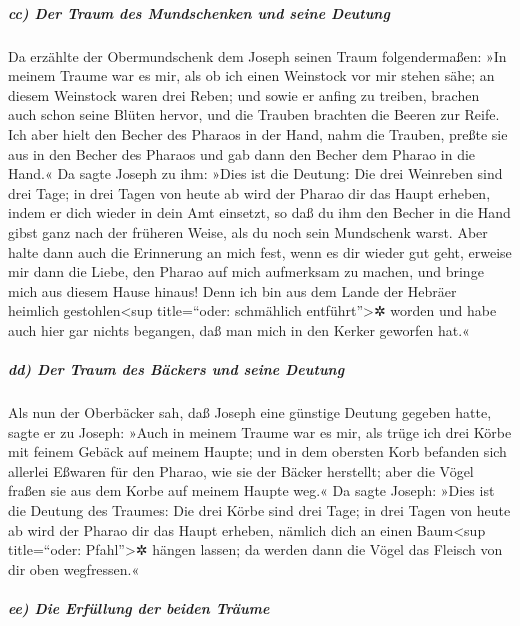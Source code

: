 \hypertarget{cc-der-traum-des-mundschenken-und-seine-deutung}{%
\subparagraph{cc) Der Traum des Mundschenken und seine
Deutung}\label{cc-der-traum-des-mundschenken-und-seine-deutung}}

 Da erzählte der Obermundschenk dem Joseph seinen Traum
folgendermaßen: »In meinem Traume war es mir, als ob ich einen Weinstock
vor mir stehen sähe;  an diesem Weinstock waren drei
Reben; und sowie er anfing zu treiben, brachen auch schon seine Blüten
hervor, und die Trauben brachten die Beeren zur Reife. 
Ich aber hielt den Becher des Pharaos in der Hand, nahm die Trauben,
preßte sie aus in den Becher des Pharaos und gab dann den Becher dem
Pharao in die Hand.«  Da sagte Joseph zu ihm: »Dies ist
die Deutung: Die drei Weinreben sind drei Tage;  in drei
Tagen von heute ab wird der Pharao dir das Haupt erheben, indem er dich
wieder in dein Amt einsetzt, so daß du ihm den Becher in die Hand gibst
ganz nach der früheren Weise, als du noch sein Mundschenk warst.
 Aber halte dann auch die Erinnerung an mich fest, wenn
es dir wieder gut geht, erweise mir dann die Liebe, den Pharao auf mich
aufmerksam zu machen, und bringe mich aus diesem Hause hinaus!
 Denn ich bin aus dem Lande der Hebräer heimlich
gestohlen\textless sup title=``oder: schmählich entführt''\textgreater✲
worden und habe auch hier gar nichts begangen, daß man mich in den
Kerker geworfen hat.«

\hypertarget{dd-der-traum-des-buxe4ckers-und-seine-deutung}{%
\subparagraph{dd) Der Traum des Bäckers und seine
Deutung}\label{dd-der-traum-des-buxe4ckers-und-seine-deutung}}

 Als nun der Oberbäcker sah, daß Joseph eine günstige
Deutung gegeben hatte, sagte er zu Joseph: »Auch in meinem Traume war es
mir, als trüge ich drei Körbe mit feinem Gebäck auf meinem Haupte;
 und in dem obersten Korb befanden sich allerlei Eßwaren
für den Pharao, wie sie der Bäcker herstellt; aber die Vögel fraßen sie
aus dem Korbe auf meinem Haupte weg.«  Da sagte Joseph:
»Dies ist die Deutung des Traumes: Die drei Körbe sind drei Tage;
 in drei Tagen von heute ab wird der Pharao dir das Haupt
erheben, nämlich dich an einen Baum\textless sup title=``oder:
Pfahl''\textgreater✲ hängen lassen; da werden dann die Vögel das Fleisch
von dir oben wegfressen.«

\hypertarget{ee-die-erfuxfcllung-der-beiden-truxe4ume}{%
\subparagraph{ee) Die Erfüllung der beiden
Träume}\label{ee-die-erfuxfcllung-der-beiden-truxe4ume}}


